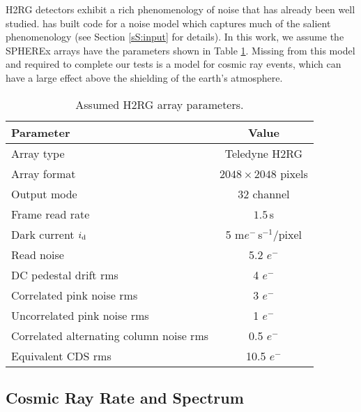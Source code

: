 \documentclass{ws-jai}
\newcommand{\e}{$e^{-}$}
\newcommand{\eps}{$e^{-} \,$s$^{-1}$}
\begin{document}
H2RG detectors exhibit a rich phenomenology of noise that has already
been well studied.  \citet{Rauscher2015} has built code for a noise
model which captures much of the salient phenomenology (see Section
\ref{sS:input} for details).  In this work, we assume the SPHEREx
arrays have the parameters shown in Table \ref{tab:arrays}.  Missing
from this model and required to complete our tests is a model for
cosmic ray events, which can have a large effect above the shielding
of the earth's atmosphere.

\begin{table}[ht]
\centering
\caption{Assumed H2RG array parameters. \label{tab:arrays}}
\begin{tabular}{lc}
\hline
Parameter & Value \\ \hline

Array type & Teledyne H2RG \\

Array format & $2048 \times 2048$ pixels \\ 

Output mode & 32 channel \\

Frame read rate & $1.5 \,$s \\

Dark current $i_{\rm d}$ & 5 m\eps/pixel \\

Read noise & 5.2 \e \\

DC pedestal drift rms & 4 \e \\

Correlated pink noise rms & 3 \e \\

Uncorrelated pink noise rms & 1 \e \\

Correlated alternating column noise rms & 0.5 \e \\ 

Equivalent CDS rms & 10.5 \e \\ \hline

\end{tabular}
\end{table}


\subsection{Cosmic Ray Rate and Spectrum}
\label{sS:cosmicrays}
\end{document}
